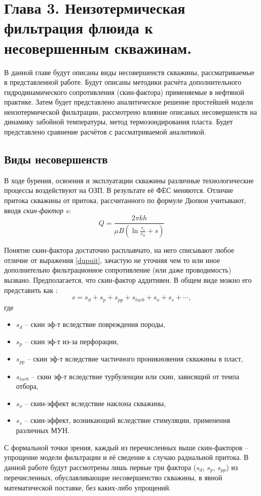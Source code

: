\section*{Глава 3. Неизотермическая фильтрация флюида к несовершенным скважинам.}

\setcounter{section}{3}
\setcounter{subsection}{0}
\setcounter{equation}{0}

	В данной главе будут описаны виды несовершенств скважины, рассматриваемые в представленной работе.
	Будут описаны методики расчёта дополнительного гидродинамического сопротивления (скин-фактора) применяемые в нефтяной практике.
	Затем будет представлено аналитическое решение простейшей модели неизотермической фильтрации, рассмотрено влияние описаных несовершенств на динамику забойной температуры, метод термозондирования пласта. Будет представлено сравнение расчётов с рассматриваемой аналитикой.

\subsection{Виды несовершенств}
	В ходе бурения, освоения и эксплуатации скважины различные технологические процессы воздействуют на ОЗП.
	В результате её ФЕС меняются.
	Отличие притока скважины от притока, рассчитанного по формуле Дюпюи учитывают, вводя \textit{скин-фактор} $s$:
\begin{equation}
	\label{dupuit}
	Q = \frac{2\pi k h}{\mu B \left(\ln\displaystyle\frac{r_e}{r_w}+s\right)}
\end{equation}

	Понятие скин-фактора достаточно расплывчато, на него списывают любое отличие от выражения \eqref{dupuit}, зачастую не уточняя чем то или иное дополнительно фильтрационное сопротивление (или даже проводимость) вызвано. Предполагается, что скин-фактор аддитивен. В общем виде можно его представить как \cite{mukerdzhi}:
\begin{equation}
	\label{skin_full}
	s = s_d + s_p + s_{pp} + s_{turb} + s_o + s_s + \cdots,
\end{equation}
	где
\begin{itemize}
\item $s_d$ -- скин эф-т вследствие повреждения породы,
\item $s_p$ -- скин эф-т из-за перфорации,
\item $s_{pp}$ -- скин эф-т вследствие частичного проникновения скважины в пласт,
\item $s_{turb}$ -- скин эф-т вследствие турбуленции или скин, зависящий от темпа отбора,
\item $s_{o}$ -- скин-эффект вследствие наклона скважины,
\item $s_{s}$ -- скин-эффект, возникающий вследствие стимуляции, применения различных МУН.
\end{itemize}
	С формальной точки зрения, каждый из перечисленных выше скин-факторов -- упрощение модели фильтрации и её сведение к случаю радиальной притока. В данной работе будут рассмотрены лишь первые три фактора ($s_d$, $s_p$, $s_{pp}$) из перечисленных, обуславливающие несовершенство скважины, в явной математической поставке, без каких-либо упрощений.

